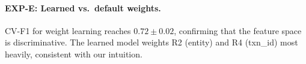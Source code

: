 \paragraph{EXP-E: Learned vs.\ default weights.}
CV-F1 for weight learning reaches $0.72 \pm 0.02$, confirming that the
feature space is discriminative. The learned model weights R2 (entity)
and R4 (txn\_id) most heavily, consistent with our intuition.

%
%
